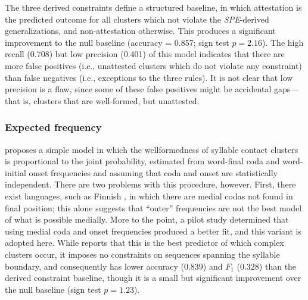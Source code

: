 The three derived constraints define a structured baseline, in which attestation is the predicted outcome for all clusters which not violate the \emph{SPE}-derived generalizations, and non-attestation otherwise. This produces a significant improvement to the null baseline (accuracy = 0.857; sign test $p = 2.16$). The high recall (0.708) but low precision (0.401) of this model indicates that there are more false positives (i.e., unattested clusters which do not violate any constraint) than false negatives (i.e., exceptions to the three rules). It is not clear that low precision is a flaw, since some of these false positives might be accidental gaps---that is, clusters that are well-formed, but unattested.

\subsubsection{Expected frequency}

\citet{Pierrehumbert1994} proposes a simple model in which the wellformedness of syllable contact clusters is proportional to the joint probability, estimated from word-final coda and word-initial onset frequencies and assuming that coda and onset are statistically independent. There are two problems with this procedure, however. First, there exist languages, such as Finnish \citep[36]{Fischer-Jorgensen1952}, in which there are medial codas not found in final position; this alone suggests that ``outer'' frequencies are not the best model of what is possible medially. More to the point, a pilot study determined that using medial coda and onset frequencies produced a better fit, and this variant is adopted here. 
While \citeauthor{Pierrehumbert1994} reports that this is the best predictor of which complex clusters occur, it imposes no constraints on sequences spanning the syllable boundary, and consequently has lower accuracy (0.839) and $F_1$ (0.328) than the derived constraint baseline, though it is a small but significant improvement over the null baseline (sign test $p = 1.23$).

\subsubsection{\citealt{Hayes2008a}}

